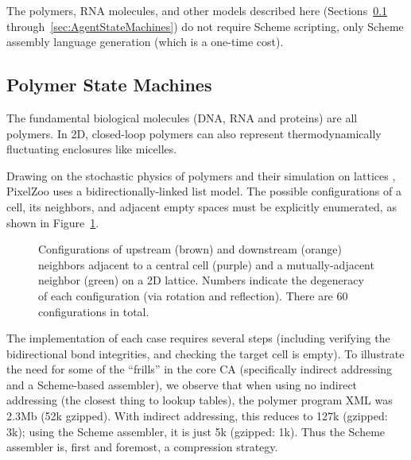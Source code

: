 \documentclass{acm_proc_article-sp}
\begin{document}
The polymers, RNA molecules, and other models described here
 (Sections~\ref{sec:PolymerStateMachines} through~\ref{sec:AgentStateMachines})
 do not require Scheme scripting, only Scheme assembly language generation (which is a one-time cost).

\subsection{Polymer State Machines}
\label{sec:PolymerStateMachines}

The fundamental biological molecules (DNA, RNA and proteins) are all polymers.
In 2D, closed-loop polymers can also represent thermodynamically fluctuating enclosures like micelles.

Drawing on the stochastic physics of polymers \cite{DoiEdwards1988}
and their simulation on lattices \cite{PhysRevLett.64.1915,journals/pc/OstrovskyCSB01},
PixelZoo uses a bidirectionally-linked list model.
The possible configurations of a cell, its neighbors, and adjacent empty spaces must
be explicitly enumerated, as shown in Figure~\ref{fig:polymer}.

\begin{figure}
\caption{
\label{fig:polymer}
Configurations of upstream (brown) and downstream (orange) neighbors adjacent to a central cell (purple) and a mutually-adjacent neighbor (green) on a 2D lattice.
Numbers indicate the degeneracy of each configuration (via rotation and reflection).
There are 60 configurations in total.
}
\end{figure}

The implementation of each case requires several steps (including verifying the bidirectional bond integrities,
and checking the target cell is empty).
To illustrate the need for some of the ``frills'' in the core CA
(specifically indirect addressing and a Scheme-based assembler),
we observe that when using no indirect addressing
(the closest thing to lookup tables), the polymer program XML was 2.3Mb (52k gzipped).
With indirect addressing, this reduces to 127k (gzipped: 3k);
using the Scheme assembler, it is just 5k (gzipped: 1k).
Thus the Scheme assembler is, first and foremost, a compression strategy.
\end{document}
